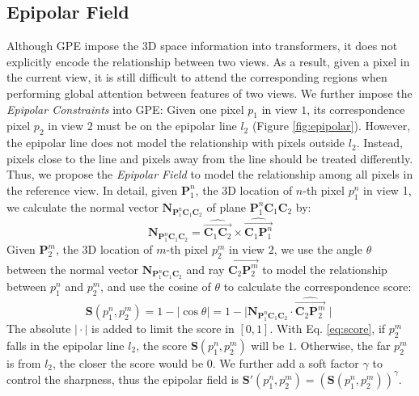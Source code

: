 \documentclass{bmvc2k}
\begin{document}
\vspace{-1.0em}
\subsection{Epipolar Field} 
\vspace{-0.5em}
Although GPE impose the 3D space information into transformers, it does not explicitly encode the relationship between two views. 
As a result, given a pixel in the current view, it is still difficult to attend the corresponding regions when performing global attention between features of two views.  
We further impose the \textit{Epipolar Constraints} \cite{andrew2001multiple} into GPE: Given one pixel $p_1$ in view $1$, its correspondence pixel $p_2$ in view $2$ must be on the epipolar line $l_2$  (Figure \ref{fig:epipolar}). 
However, the epipolar line does not model the relationship with pixels outside $l_2$. Instead, pixels close to the line and pixels away from the line should be treated differently. Thus, we propose the \textit{Epipolar Field} to model the relationship among all pixels in the reference view. In detail, given $\mathbf{P}_1^n$, the 3D location of $n$-th pixel $p_1^n$ in view 1, we calculate  the normal vector $\mathbf{N}_{\mathbf{P}_1^n\mathbf{C}_1\mathbf{C}_2}$ of plane $\mathbf{P}_1^n\mathbf{C}_1\mathbf{C}_2$ by: 
\begin{equation}
    \mathbf{N}_{\mathbf{P}_1^n\mathbf{C}_1\mathbf{C}_2} = \widehat{\overrightarrow{\mathbf{C}_1 \mathbf{C}_2}}  \times  \widehat{\overrightarrow{\mathbf{C}_1 \mathbf{P}_1^n}  }
\end{equation}
Given $\mathbf{P}_2^m$, the 3D location of $m$-th pixel $p_2^m$ in view $2$, we use the angle $\theta$ between the normal vector $\mathbf{N}_{\mathbf{P}_1^n\mathbf{C}_1\mathbf{C}_2}$ and ray  $\overrightarrow{\mathbf{C}_2 \mathbf{P}_2^m}$ to model the relationship between $p_1^n$ and $p_2^m$, and use the cosine of $\theta$ to calculate the correspondence score: 
\begin{equation}
    \mathbf{S}(p_1^n, p_2^m) = 1 - \mid \cos \theta \mid = 1 -  \mid \mathbf{N}_{\mathbf{P}_1^n\mathbf{C}_1\mathbf{C}_2}  \cdot   \widehat{\overrightarrow{\mathbf{C}_2 \mathbf{P}_2^m}} \mid
    \label{eq:score}
\end{equation}
The absolute $\mid \cdot \mid$ is added to limit the score in $[0, 1]$. 
With Eq. \ref{eq:score}, if $p_2^m$ falls in the epipolar line $l_2$, the score $\mathbf{S}(p_1^n, p_2^m)$ will be $1$. Otherwise, the far $p_2^m$ is from $l_2$, the closer the score would be $0$. We further add a soft factor $\gamma$ to control the sharpness, thus the  epipolar field is $\mathbf{S}'(p_1^n, p_2^m) = (\mathbf{S}(p_1^n, p_2^m))^\gamma$. 
\end{document}
